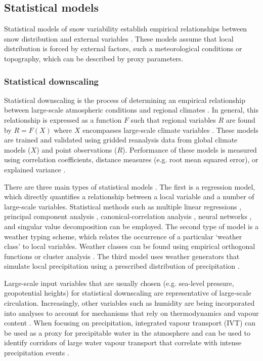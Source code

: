 \documentclass{sfuthesis}
\begin{document}
\subsection{Statistical models}
Statistical models of snow variability establish empirical relationships between snow distribution and external variables \citep{Fowler2007}. These models assume that local distribution is forced by external factors, such a meteorological conditions or topography, which can be described by proxy parameters.

\subsubsection{Statistical downscaling}
Statistical downscaling is the process of determining an empirical relationship between large-scale atmospheric conditions and regional climates \citep{Fowler2007}. In general, this relationship is expressed as a function $F$ such that regional variables $R$ are found by $R=F(X)$ where $X$ encompasses large-scale climate variables \citep{Fowler2007}. These models are trained and validated using gridded reanalysis data from global climate models ($X$) and point observations ($R$). Performance of these models is measured using correlation coefficients, distance measures (e.g. root mean squared error), or explained variance \citep{Fowler2007}. 

There are three main types of statistical models \citep{Fowler2007}. The first is a regression model, which directly quantifies a relationship between a local variable and a number of large-scale variables. Statistical methods such as multiple linear regressions \citep{Hanssen-Bauer1998}, principal component analysis \citep{Kidson1998}, canonical-correlation analysis \citep{Busuioc2001}, neural networks \citep{Zorita1999}, and singular value decomposition \citep{Widmann2003} can be employed.  The second type of model is a weather typing scheme, which relates the occurrence of a particular `weather class' to local variables. Weather classes can be found using empirical orthogonal functions or cluster analysis \citep{Fowler2007}. The third model uses weather generators that simulate local precipitation using a prescribed distribution of precipitation \citep{Fowler2007}. 

Large-scale input variables that are usually chosen (e.g. sea-level pressure, geopotential heights) for statistical downscaling are representative of large-scale circulation. Increasingly, other variables such as humidity are being incorporated into analyses to account for mechanisms that rely on thermodynamics and vapour content \citep{Fowler2007}. When focusing on precipitation, integrated vapour transport (IVT) can be used as a proxy for precipitable water in the atmosphere and can be used to identify corridors of large water vapour transport that correlate with intense precipitation events \citep{Neiman2008}. 
\end{document}
